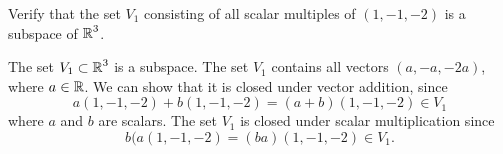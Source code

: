 \documentclass{ximera}
\begin{document}
\begin{exercise} \label{c5.1.1}
Verify that the set $V_1$ consisting of all scalar multiples of
$(1,-1,-2)$ is a subspace of $\mbox{$\Bbb{R}$}^3$.

\begin{solution}

The set $V_1 \subset \mbox{$\Bbb{R}$}^3$ is a subspace.
The set $V_1$ contains all vectors $(a,-a,-2a)$,
where $a \in \mbox{$\Bbb{R}$}$.  We can show that it is closed under
vector addition, since
\[
a(1,-1,-2) + b(1,-1,-2) = (a + b)(1,-1,-2) \in V_1
\]
where $a$ and $b$ are scalars.  The set $V_1$ is closed under scalar
multiplication since
\[
b(a(1,-1,-2) = (ba)(1,-1,-2) \in V_1.
\]

\end{solution}
\end{exercise}
\end{document}
